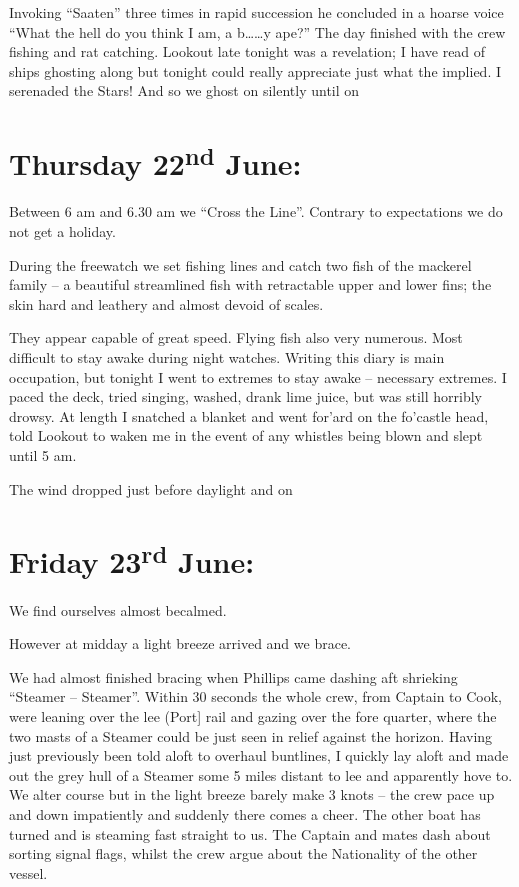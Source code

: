 \documentclass[
  11pt,
  msmallroyalvopaper
]{memoir}
\begin{document}
Invoking ``Saaten'' three times in rapid succession he concluded in a
hoarse voice ``What the hell do you think I am, a b\ldots\ldots y ape?''
The day finished with the crew fishing and rat catching. Lookout late
tonight was a revelation; I have read of ships ghosting along but
tonight could really appreciate just what the implied. I serenaded the
Stars! And so we ghost on silently until on

\hypertarget{thursday-22nd-june}{%
\section{\texorpdfstring{Thursday 22\textsuperscript{nd}
June:}{Thursday 22nd June:}}\label{thursday-22nd-june}}

Between 6 am and 6.30 am we ``Cross the Line''. Contrary to expectations
we do not get a holiday.

During the freewatch we set fishing lines and catch two fish of the
mackerel family -- a beautiful streamlined fish with retractable upper
and lower fins; the skin hard and leathery and almost devoid of scales.

They appear capable of great speed. Flying fish also very numerous. Most
difficult to stay awake during night watches. Writing this diary is main
occupation, but tonight I went to extremes to stay awake -- necessary
extremes. I paced the deck, tried singing, washed, drank lime juice, but
was still horribly drowsy. At length I snatched a blanket and went
for'ard on the fo'castle head, told Lookout to waken me in the event of
any whistles being blown and slept until 5 am.

The wind dropped just before daylight and on

\hypertarget{friday-23rd-june}{%
\section{\texorpdfstring{Friday 23\textsuperscript{rd}
June:}{Friday 23rd June:}}\label{friday-23rd-june}}

We find ourselves almost becalmed.

However at midday a light breeze arrived and we brace.

We had almost finished bracing when Phillips came dashing aft shrieking
``Steamer -- Steamer''. Within 30 seconds the whole crew, from Captain
to Cook, were leaning over the lee (Port{]} rail and gazing over the
fore quarter, where the two masts of a Steamer could be just seen in
relief against the horizon. Having just previously been told aloft to
overhaul buntlines, I quickly lay aloft and made out the grey hull of a
Steamer some 5 miles distant to lee and apparently hove to. We alter
course but in the light breeze barely make 3 knots -- the crew pace up
and down impatiently and suddenly there comes a cheer. The other boat
has turned and is steaming fast straight to us. The Captain and mates
dash about sorting signal flags, whilst the crew argue about the
Nationality of the other vessel.
\end{document}
